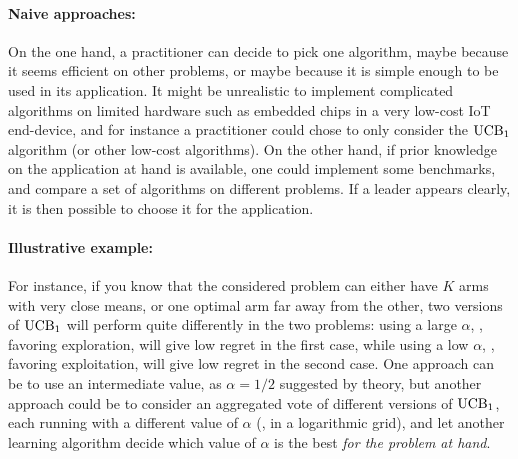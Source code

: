 \paragraph{Naive approaches:}
%
On the one hand, a practitioner can decide to pick one algorithm, maybe because it seems efficient on other problems, or maybe because it is simple enough to be used in its application. It might be unrealistic to implement complicated algorithms on limited hardware such as embedded chips in a very low-cost IoT end-device, and for instance a practitioner could chose to only consider the $\mathrm{UCB}_1$ algorithm (or other low-cost algorithms).
%
On the other hand, if prior knowledge on the application at hand is available, one could implement some benchmarks, and compare a set of algorithms on different problems. If a leader appears clearly, it is then possible to choose it for the application.


\paragraph{Illustrative example:}
%
For instance, if you know that the considered problem can either have $K$ arms with very close means, or one optimal arm far away from the other, two versions of $\mathrm{UCB}_1$ will perform quite differently in the two problems:
using a large $\alpha$, \ie, favoring exploration, will give low regret in the first case,
while using a low $\alpha$, \ie, favoring exploitation, will give low regret in the second case.
One approach can be to use an intermediate value, as $\alpha=1/2$ suggested by theory, but another approach could be to consider an aggregated vote of different versions of $\mathrm{UCB}_1$, each running with a different value of $\alpha$ (\eg, in a logarithmic grid), and let another learning algorithm decide which value of $\alpha$ is the best \emph{for the problem at hand}.



